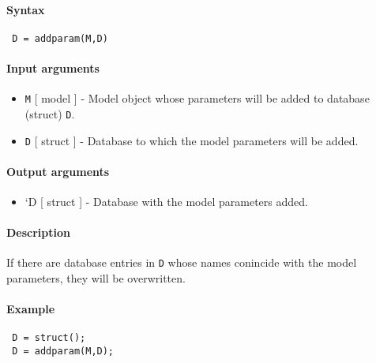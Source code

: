 


	\paragraph{Syntax}
 
 \begin{verbatim}
 D = addparam(M,D)
 \end{verbatim}
 
 \paragraph{Input arguments}
 
 \begin{itemize}
 \item
   \texttt{M} {[} model {]} - Model object whose parameters will be added
   to database (struct) \texttt{D}.
 \item
   \texttt{D} {[} struct {]} - Database to which the model parameters
   will be added.
 \end{itemize}
 
 \paragraph{Output arguments}
 
 \begin{itemize}
 \item
   `D {[} struct {]} - Database with the model parameters added.
 \end{itemize}
 
 \paragraph{Description}
 
 If there are database entries in \texttt{D} whose names conincide with
 the model parameters, they will be overwritten.
 
 \paragraph{Example}
 
 \begin{verbatim}
 D = struct();
 D = addparam(M,D);
 \end{verbatim}


